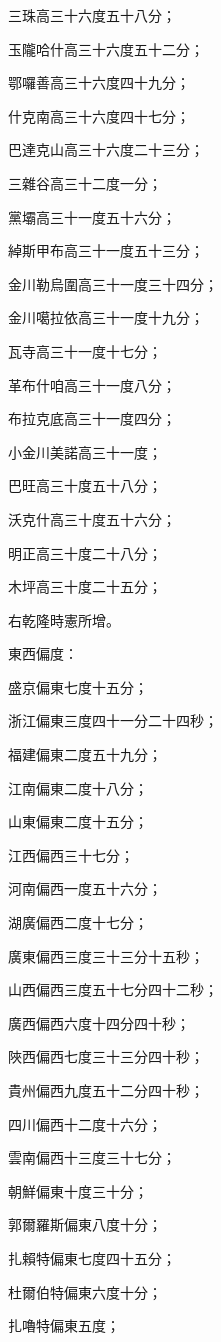 \begin{pinyinscope}
三珠高三十六度五十八分；

玉隴哈什高三十六度五十二分；

鄂囉善高三十六度四十九分；

什克南高三十六度四十七分；

巴達克山高三十六度二十三分；

三雜谷高三十二度一分；

黨壩高三十一度五十六分；

綽斯甲布高三十一度五十三分；

金川勒烏圍高三十一度三十四分；

金川噶拉依高三十一度十九分；

瓦寺高三十一度十七分；

革布什咱高三十一度八分；

布拉克底高三十一度四分；

小金川美諾高三十一度；

巴旺高三十度五十八分；

沃克什高三十度五十六分；

明正高三十度二十八分；

木坪高三十度二十五分；

右乾隆時憲所增。

東西偏度：

盛京偏東七度十五分；

浙江偏東三度四十一分二十四秒；

福建偏東二度五十九分；

江南偏東二度十八分；

山東偏東二度十五分；

江西偏西三十七分；

河南偏西一度五十六分；

湖廣偏西二度十七分；

廣東偏西三度三十三分十五秒；

山西偏西三度五十七分四十二秒；

廣西偏西六度十四分四十秒；

陜西偏西七度三十三分四十秒；

貴州偏西九度五十二分四十秒；

四川偏西十二度十六分；

雲南偏西十三度三十七分；

朝鮮偏東十度三十分；

郭爾羅斯偏東八度十分；

扎賴特偏東七度四十五分；

杜爾伯特偏東六度十分；

扎嚕特偏東五度；


\end{pinyinscope}
